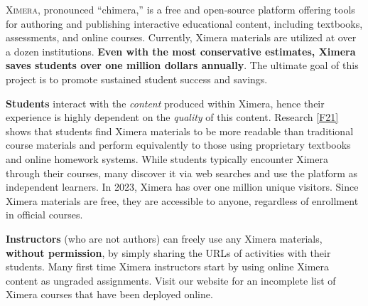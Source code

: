 \documentclass[twocolumn]{article}
\begin{document}
\pagestyle{main}
\thispagestyle{title}
\noindent
\lettrine[lines=2]{X}{imera}, pronounced ``chimera,'' is a free and
open-source platform offering tools for authoring and publishing
interactive educational content, including textbooks, assessments, and
online
courses. Currently, Ximera materials are utilized at over a dozen
institutions. \textbf{Even with the most conservative estimates, Ximera saves
    students
    over one million dollars annually}. The ultimate goal of this project is to
promote sustained student success and savings.

\begin{xframe}
    {\sffamily\bfseries Students} interact with the \textit{content} produced within
    Ximera, hence their experience is highly dependent on the \textit{quality} of this
    content. Research \ref{F21} shows that students find Ximera materials to be more readable
    than traditional course materials and perform equivalently to those using
    proprietary textbooks and online homework systems. While students typically
    encounter Ximera through their courses, many discover it via web searches and
    use the platform as independent learners. In 2023, Ximera has over one million
    unique visitors. Since Ximera materials are free, they are accessible to
    anyone, regardless of enrollment in official courses.
\end{xframe}
\begin{xframe}
    {\sffamily\bfseries Instructors} (who are not authors) can freely use
    any Ximera materials,
    \textbf{without permission}, by simply sharing the URLs of activities
    with their students. Many first time Ximera instructors start  by
    using online Ximera content as
    ungraded assignments. Visit our website for an incomplete list of
    Ximera courses that have been deployed online.
\end{xframe}
\end{document}
